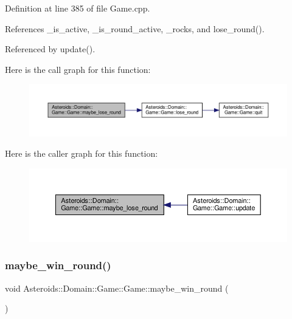Definition at line 385 of file Game.\+cpp.



References \+\_\+is\+\_\+active, \+\_\+is\+\_\+round\+\_\+active, \+\_\+rocks, and lose\+\_\+round().



Referenced by update().

Here is the call graph for this function\+:\nopagebreak
\begin{figure}[H]
\begin{center}
\leavevmode
\includegraphics[width=350pt]{classAsteroids_1_1Domain_1_1Game_1_1Game_a5b851b86192080f5f59d61f689bf97a4_cgraph}
\end{center}
\end{figure}
Here is the caller graph for this function\+:\nopagebreak
\begin{figure}[H]
\begin{center}
\leavevmode
\includegraphics[width=350pt]{classAsteroids_1_1Domain_1_1Game_1_1Game_a5b851b86192080f5f59d61f689bf97a4_icgraph}
\end{center}
\end{figure}
\mbox{\label{classAsteroids_1_1Domain_1_1Game_1_1Game_abf55b1a7206729ce7e384bc8e6cb73d0}} 
\subsubsection{\texorpdfstring{maybe\+\_\+win\+\_\+round()}{maybe\_win\_round()}}
{\footnotesize\ttfamily void Asteroids\+::\+Domain\+::\+Game\+::\+Game\+::maybe\+\_\+win\+\_\+round (\begin{DoxyParamCaption}{ }\end{DoxyParamCaption})\hspace{0.3cm}{\ttfamily [private]}}



